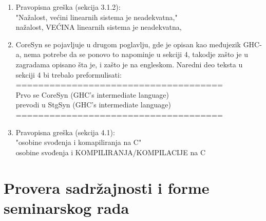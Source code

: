 \documentclass[a4paper]{report}
\begin{document}
\begin{enumerate}
	\item Pravopisna greška (sekcija 3.1.2):\\	
	"Nažalost, većini linearnih sistema je neadekvatna,"\\
	nažalost, VEĆINA linearnih sistema je neadekvatna,
	
	\item CoreSyn se pojavljuje u drugom poglavlju, gde je opisan kao međujezik GHC-a, nema potrebe da se ponovo to napominje u sekciji 4, takodje zašto je u zagradama opisano šta je, i zašto je na engleskom. Naredni deo teksta u sekciji 4 bi trebalo preformulisati:\\
	=====================================\\
	Prvo se CoreSyn (GHC's intermediate language)\\
	prevodi u StgSyn (GHC's intermediate language)\\
	=====================================
	
	\item Pravopisna greška (sekcija 4.1):\\
	"osobine svođenja i komapiliranja na C"\\
	osobine svođenja i KOMPILIRANJA/KOMPILACIJE na C
	
\end{enumerate}





\section{Provera sadržajnosti i forme seminarskog rada}
\end{document}
